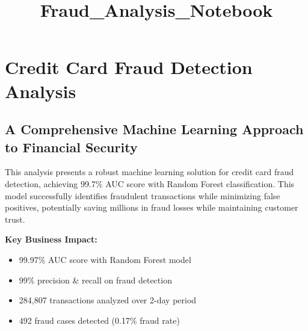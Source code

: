 \documentclass[11pt]{article}
\title{Fraud\_Analysis\_Notebook}
\providecommand{\tightlist}{%
      \setlength{\itemsep}{0pt}\setlength{\parskip}{0pt}}
\begin{document}
    
    \maketitle
    
    

    
    \section{Credit Card Fraud Detection
Analysis}\label{credit-card-fraud-detection-analysis}

\subsection{A Comprehensive Machine Learning Approach to Financial
Security}\label{a-comprehensive-machine-learning-approach-to-financial-security}

    This analysis presents a robust machine learning solution for credit
card fraud detection, achieving 99.7\% AUC score with Random Forest
classification. This model successfully identifies fraudulent
transactions while minimizing false positives, potentially saving
millions in fraud losses while maintaining customer trust.

\textbf{Key Business Impact:}

\begin{itemize}
\tightlist
\item
  99.97\% AUC score with Random Forest model
\item
  99\% precision \& recall on fraud detection
\item
  284,807 transactions analyzed over 2-day period
\item
  492 fraud cases detected (0.17\% fraud rate)
\end{itemize}
\end{document}
